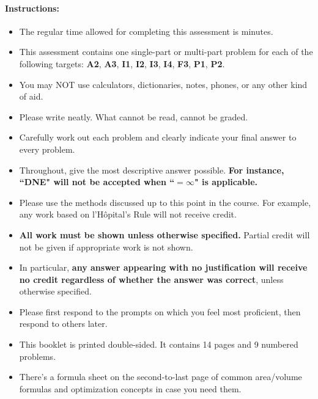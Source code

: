 \documentclass[11pt]{article}
\begin{document}
{%

\paragraph*{Instructions:}

\begin{itemize}
    
    \item The regular time allowed for completing this assessment is  minutes.
    \item This assessment contains one single-part or multi-part problem for each of the following targets:  {\bf\color{RedOrange}A2}, {\bf\color{RedOrange}A3}, {\bf\color{Fuchsia}I1}, {\bf\color{Fuchsia}I2}, {\bf\color{Fuchsia}I3}, {\bf\color{Fuchsia}I4}, {\bf\color{ProcessBlue}F3}, {\bf\color{Orange}P1}, {\bf\color{Orange}P2}.
    \item You may NOT use calculators, dictionaries, notes, phones, or any other kind of aid.
    \item Please write neatly. What cannot be read, cannot be graded.
    \item Carefully work out each problem and clearly indicate your final answer to every problem.
    \item Throughout, give the most descriptive answer possible. \textbf{For instance, ``DNE" will not be accepted when ``$=\infty$" is applicable.}
    \item Please use the methods discussed up to this point in the course. For example, any work based on l'H\^opital's Rule will not receive credit.
    \item \textbf{All work must be shown unless otherwise specified.} Partial credit will not be given if appropriate work is not shown.
    \item In particular, {\bf any answer appearing with no justification will receive no credit regardless of whether the answer was correct}, unless otherwise specified.
    \item Please first respond to the prompts on which you feel most proficient, then respond to others later.
    \item This booklet is printed double-sided. It contains 14 pages and 9 numbered problems.
    \item There's a formula sheet on the second-to-last page of common area/volume formulas and optimization concepts in case you need them.
    \end{itemize}
    
}
\end{document}
